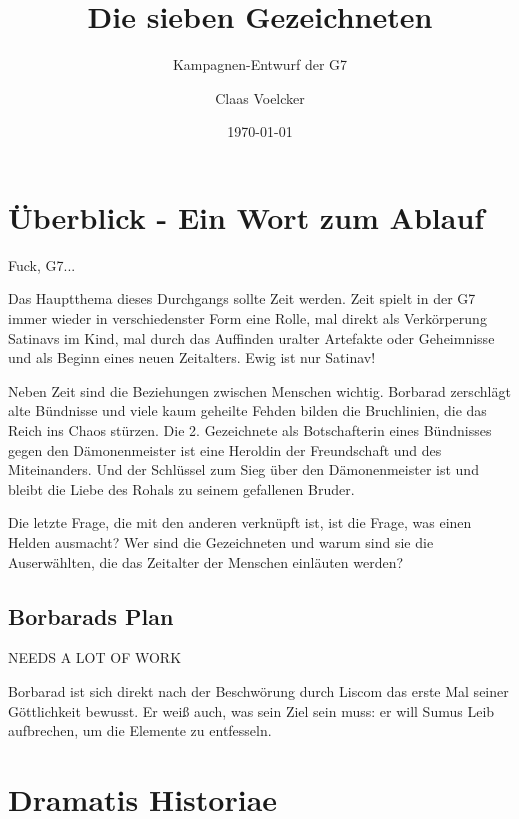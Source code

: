 \documentclass[11pt]{scrreprt}
\title{Die sieben Gezeichneten}
\subtitle{Kampagnen-Entwurf der G7}
\author{Claas Voelcker}
\date{\today}
\begin{document}
\maketitle

\begin{abstract}

\end{abstract}

\tableofcontents

\chapter{Überblick - Ein Wort zum Ablauf}
Fuck, G7... 

Das Hauptthema dieses Durchgangs sollte Zeit werden. Zeit spielt in der G7 immer wieder in verschiedenster Form eine Rolle, mal direkt als Verkörperung Satinavs im Kind, mal durch das Auffinden uralter Artefakte oder Geheimnisse und als Beginn eines neuen Zeitalters. Ewig ist nur Satinav!

Neben Zeit sind die Beziehungen zwischen Menschen wichtig. Borbarad zerschlägt alte Bündnisse und viele kaum geheilte Fehden bilden die Bruchlinien, die das Reich ins Chaos stürzen. Die 2. Gezeichnete als Botschafterin eines Bündnisses gegen den Dämonenmeister ist eine Heroldin der Freundschaft und des Miteinanders. Und der Schlüssel zum Sieg über den Dämonenmeister ist und bleibt die Liebe des Rohals zu seinem gefallenen Bruder.

Die letzte Frage, die mit den anderen verknüpft ist, ist die Frage, was einen Helden ausmacht? Wer sind die Gezeichneten und warum sind sie die Auserwählten, die das Zeitalter der Menschen einläuten werden?

\section{Borbarads Plan}

NEEDS A LOT OF WORK

Borbarad ist sich direkt nach der Beschwörung durch Liscom das erste Mal seiner Göttlichkeit bewusst. Er weiß auch, was sein Ziel sein muss: er will Sumus Leib aufbrechen, um die Elemente zu entfesseln.


\chapter{Dramatis Historiae}


\newpage

\newpage

\newpage

\newpage

\newpage

\newpage

\newpage

\newpage

\newpage

\newpage

\newpage

\newpage

\newpage

\newpage

\end{document}
